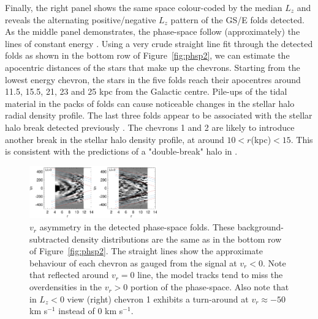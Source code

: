\documentclass[a4paper,useAMS,usenatbib]{mnras}
\begin{document}
Finally, the right panel shows the same space colour-coded by the median $L_z$ and reveals the alternating positive/negative $L_z$ pattern of the GS/E folds detected. As the middle panel demonstrates, the phase-space follow (approximately) the lines of constant energy \citep[see][for an extensive discussion]{DongPaez2022}. Using a very crude straight line fit through the detected folds as shown in the bottom row of Figure~\ref{fig:phsp2}, we can estimate the apocentric distances of the stars that make up the chevrons. Starting from the lowest energy chevron, the stars in the five folds reach their apocentres around 11.5, 15.5, 21, 23 and 25 kpc from the Galactic centre. Pile-ups of the tidal material in the packs of folds can cause noticeable changes in the stellar halo radial density profile. The last three folds appear to be associated with the stellar halo break detected previously \citep[see e.g.][]{Watkins2009,Deason2011,Sesar2011}. The chevrons 1 and 2 are likely to introduce another break in the stellar halo density profile, at around $10<r$(kpc)$<15$. This is consistent with the predictions of a "double-break" halo in \citet{Naidu2021}.

%
\begin{figure}
  \centering
  \includegraphics[width=0.49\textwidth]{img/phase_space_asym.pdf}
  \caption[]{$v_r$ asymmetry in the detected phase-space folds. These background-subtracted density distributions are the same as in the bottom row of Figure~\ref{fig:phsp2}. The straight lines show the approximate behaviour of each chevron as gauged from the signal at $v_r<0$. Note that reflected around $v_r=0$ line, the model tracks tend to miss the overdensities in the $v_r>0$ portion of the phase-space. Also note that in $L_z<0$ view (right) chevron 1 exhibits a turn-around at $v_r\approx-50$ km s$^{-1}$ instead of 0 km s$^{-1}$.}
   \label{fig:phsp_asym}
\end{figure}
%
\end{document}
